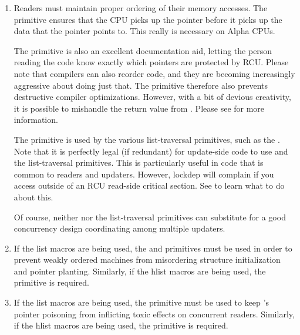 \begin{enumerate}[start=0]
	\begin{enumerate}
	\item	Readers must maintain proper ordering of their memory
		accesses.
		The  primitive ensures that
		the CPU picks up the pointer before it picks up the data
		that the pointer points to.
		This really is necessary
		on Alpha CPUs.

		The  primitive is also an excellent
		documentation aid, letting the person reading the
		code know exactly which pointers are protected by RCU\@.
		Please note that compilers can also reorder code, and
		they are becoming increasingly aggressive about doing
		just that.
		The  primitive therefore also
		prevents destructive compiler optimizations.
		However,
		with a bit of devious creativity, it is possible to
		mishandle the return value from .
		Please see  for more information.

		The  primitive is used by the
		various  list-traversal primitives, such
		as the .
		Note that it is
		perfectly legal (if redundant) for update-side code to
		use  and the  list-traversal
		primitives.
		This is particularly useful in code that
		is common to readers and updaters.
		However, lockdep
		will complain if you access  outside
		of an RCU read-side critical section.
		See 
		to learn what to do about this.

		Of course, neither  nor the 
		list-traversal primitives can substitute for a good
		concurrency design coordinating among multiple updaters.

	\item	If the list macros are being used, the 
		and  primitives must be used in order
		to prevent weakly ordered machines from misordering
		structure initialization and pointer planting.
		Similarly, if the hlist macros are being used, the
		 primitive is required.

	\item	If the list macros are being used, the 
		primitive must be used to keep 's pointer
		poisoning from inflicting toxic effects on concurrent
		readers.
		Similarly, if the hlist macros are being used,
		the  primitive is required.


\end{enumerate}
\end{enumerate}

